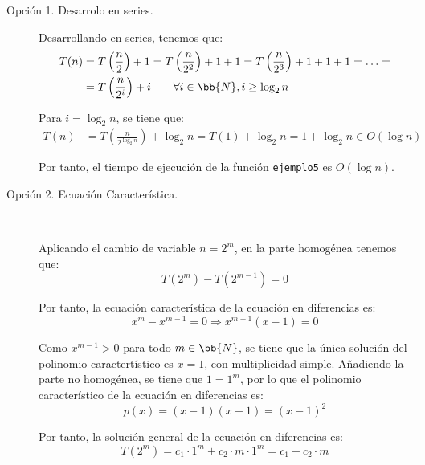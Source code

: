 \begin{ejercicio}
\begin{enumerate}
        \begin{description}
            \item[Opción 1. Desarrolo en series.] 

            Desarrollando en series, tenemos que:
            \begin{align*}
                T(n) &= T\left(\frac{n}{2}\right) + 1 = T\left(\frac{n}{2^2}\right) + 1 + 1 = T\left(\frac{n}{2^3}\right) + 1 + 1 + 1 = \ldots
                =\\ &= T\left(\frac{n}{2^i}\right) + i \qquad \forall i\in \bb{N}, i\geq \log_2 n
            \end{align*}

            Para $i=\log_2 n$, se tiene que:
            \begin{align*}
                T(n) &= T\left(\frac{n}{2^{\log_2 n}}\right) + \log_2 n
                = T(1) + \log_2 n
                = 1 + \log_2 n \in O(\log n)
            \end{align*}

            Por tanto, el tiempo de ejecución de la función \verb|ejemplo5| es $O(\log n)$.

            \item [Opción 2. Ecuación Característica.]~

            Aplicando el cambio de variable $n=2^m$, en la parte homogénea tenemos que:
            \begin{equation*}
                T(2^m) - T(2^{m-1}) = 0
            \end{equation*}

            Por tanto, la ecuación característica de la ecuación en diferencias es:
            \begin{equation*}
                x^m - x^{m-1} = 0 \Longrightarrow x^{m-1}(x-1) = 0
            \end{equation*}

            Como $x^{m-1}>0$ para todo $m\in \bb{N}$, se tiene que la única solución del polinomio caractertístico es $x=1$,
            con multiplicidad simple. Añadiendo la parte no homogénea, se tiene que $1=1^m$, por lo que el polinomio característico
            de la ecuación en diferencias es:
            \begin{equation*}
                p(x) = (x-1)(x-1) = (x-1)^2
            \end{equation*}

            Por tanto, la solución general de la ecuación en diferencias es:
            \begin{equation*}
                T(2^m) = c_1\cdot 1^m + c_2\cdot m\cdot 1^m = c_1 + c_2\cdot m
            \end{equation*}


\end{description}
\end{enumerate}
\end{ejercicio}
